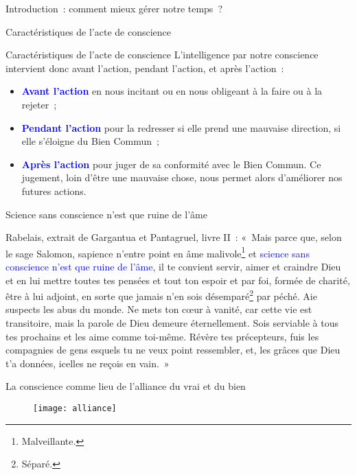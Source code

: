 \documentclass[11pt,xcolor=dvipsname,ignorenonframetext,handout]{beamer}
\begin{document}
\begin{frame}{Introduction~: comment mieux gérer notre temps~?}
\begin{frame}{Caractéristiques de l'acte de conscience}
\begin{itemize}
    \end{itemize}
\end{frame}
\begin{frame}{Caractéristiques de l'acte de conscience}
    L'intelligence par notre conscience intervient donc avant l'action, pendant l'action, et après l'action~:
    \begin{itemize}
        \rightskip=0pt\leftskip=0pt
        \item \textcolor{blue}{\textbf{Avant l'action}} en nous incitant ou en nous obligeant à la faire ou à la rejeter~;
        \item \textcolor{blue}{\textbf{Pendant l'action}} pour la redresser si elle prend une mauvaise direction, si elle s'éloigne du Bien Commun~;
        \item \textcolor{blue}{\textbf{Après l'action}} pour juger de sa conformité avec le Bien Commun. Ce jugement, loin d'être une mauvaise chose, nous permet alors d'améliorer nos futures actions.
    \end{itemize}
\end{frame}
\begin{frame}{Science sans conscience n'est que ruine de l'âme}
    \begin{block}{Rabelais, extrait de Gargantua et Pantagruel, livre II~:}
    \rightskip=0pt\leftskip=0pt
    «~Mais parce que, selon le sage Salomon, sapience n'entre point en âme malivole\footnote[frame]{Malveillante.} et \textcolor{blue}{science sans conscience n'est que ruine de l'âme}, il te convient servir, aimer et craindre Dieu et en lui mettre toutes tes pensées et tout ton espoir et par foi, formée de charité, être à lui adjoint, en sorte que jamais n'en sois désemparé\footnote[frame]{Séparé.} par péché. Aie suspects les abus du monde. Ne mets ton cœur à vanité, car cette vie est transitoire, mais la parole de Dieu demeure éternellement. Sois serviable à tous tes prochains et les aime comme toi-même. Révère tes précepteurs, fuis les compagnies de gens esquels tu ne veux point ressembler, et, les grâces que Dieu t'a données, icelles ne reçois en vain.~»
\end{block}
\end{frame}
\begin{frame}{La conscience comme lieu de l'alliance du vrai et du bien}
    {
        \begin{figure}
          \centering
          \texttt{[image: alliance]}
        \end{figure}
          }
\end{frame}

\end{frame}
\end{document}
